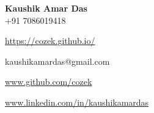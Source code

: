 \documentclass{resume} %
\begin{document}
\begin{minipage}{0.8\textwidth}

{\Huge  \bf Kaushik Amar Das}\vspace{10px} \\
{\fontsize{14}{14}{\faMobile}} \enspace +91 7086019418 \par
\faGlobe \enspace \url{https://cozek.github.io/} \par
\faEnvelope \enspace kaushikamardas@gmail.com \par
\faGithubSquare \enspace \url{www.github.com/cozek} \par
\faLinkedinSquare \enspace \url{www.linkedin.com/in/kaushikamardas} \par
\end{minipage}
\noindent\begin{minipage}{0.2\textwidth}%
\end{minipage}%
\hfill%
\newline




\end{document}
